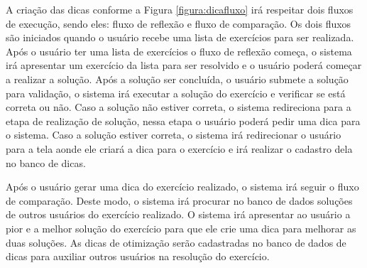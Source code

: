 A criação das dicas conforme a Figura \ref{figura:dicafluxo} irá respeitar dois fluxos de execução, sendo eles: fluxo de reflexão e fluxo de comparação. Os dois fluxos são iniciados quando o usuário recebe uma lista de exercícios para ser realizada. Após o usuário ter uma lista de exercícios o fluxo de reflexão começa, o sistema irá apresentar um exercício da lista para ser resolvido e o usuário poderá começar a realizar a solução. Após a solução ser concluída, o usuário submete a solução para validação, o sistema irá executar a solução do exercício e verificar se está correta ou não. Caso a solução não estiver correta, o sistema redireciona para a etapa de realização de solução, nessa etapa o usuário poderá pedir uma dica para o sistema. Caso a solução estiver correta, o sistema irá redirecionar o usuário para a tela aonde ele criará a dica para o exercício e irá realizar o cadastro dela no banco de dicas.

Após o usuário gerar uma dica do exercício realizado, o sistema irá seguir o fluxo de comparação. Deste modo, o sistema irá procurar no banco de dados soluções de outros usuários do exercício realizado. O sistema irá apresentar ao usuário a pior e a melhor solução do exercício para que ele crie uma dica para melhorar as duas soluções. As dicas de otimização serão cadastradas no banco de dados de dicas para auxiliar outros usuários na resolução do exercício.





